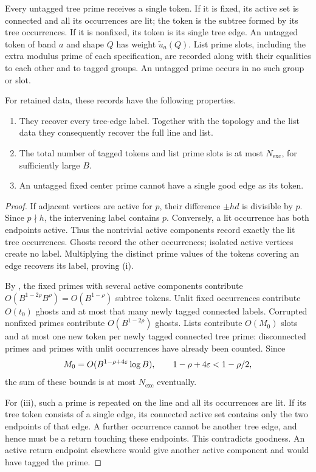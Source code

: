 Every untagged tree prime receives a single token.  If it is fixed, its
active set is connected and all its occurrences are lit; the token is
the subtree formed by its tree occurrences.  If it is nonfixed, its token
is its single tree edge.  An untagged token of band $a$ and shape $Q$
has weight $\widetilde u_a(Q)$.  List prime slots, including the extra
modulus prime of each specification, are recorded along with their
equalities to each other and to tagged groups.  An untagged prime occurs
in no such group or slot.

\begin{lemma}\label{lem:trace-token-record}
For retained data, these records have the following properties.
\begin{enumerate}[label=(\roman*)]
 \item They recover every tree-edge label.  Together with the topology
 and the list data they consequently recover the full line and list.
 \item The total number of tagged tokens and list prime slots is at
 most $N_{\mathrm{exc}}$, for sufficiently large $B$.
 \item An untagged fixed center prime cannot have a single good edge
 as its token.
\end{enumerate}
\end{lemma}

\begin{proof}
If adjacent vertices are active for $p$, their difference $\pm hd$ is
divisible by $p$.  Since $p\nmid h$, the intervening label contains $p$.
Conversely, a lit occurrence has both endpoints active.  Thus the
nontrivial active components record exactly the lit tree occurrences.
Ghosts record the other occurrences; isolated active vertices create no
label.  Multiplying the distinct prime values of the tokens covering an
edge recovers its label, proving (i).

By , the fixed primes with several active
components contribute $O(B^{1-2\rho}B^\rho)=O(B^{1-\rho})$ subtree
tokens.  Unlit fixed occurrences contribute $O(t_0)$ ghosts and at most
that many newly tagged connected labels.  Corrupted nonfixed primes
contribute $O(B^{1-2\rho})$ ghosts.  Lists contribute $O(M_0)$ slots
and at most one new token per newly tagged connected tree prime:
disconnected primes and primes with unlit occurrences have already been
counted.  Since
\[
 M_0=O(B^{1-\rho+4\varepsilon}\log B),\qquad
 1-\rho+4\varepsilon<1-\rho/2,
\]
the sum of these bounds is at most $N_{\mathrm{exc}}$ eventually.

For (iii), such a prime is repeated on the line and all its occurrences
are lit.  If its tree token consists of a single edge, its connected
active set contains only the two endpoints of that edge.  A further
occurrence cannot be another tree edge, and hence must be a return
touching these endpoints.  This contradicts goodness.  An active return
endpoint elsewhere would give another active component and would have
tagged the prime.
\end{proof}

